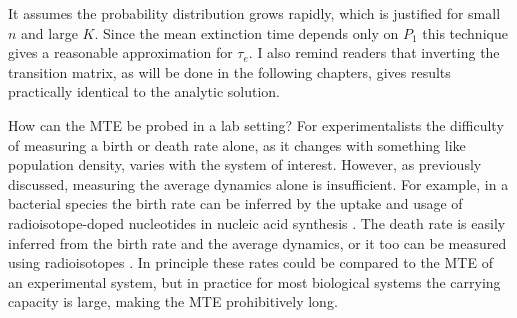 It assumes the probability distribution grows rapidly, which is justified for small $n$ and large $K$. 
Since the mean extinction time depends only on $P_1$ this technique gives a reasonable approximation for $\tau_e$. 
I also remind readers that inverting the transition matrix, as will be done in the following chapters, gives results practically identical to the analytic solution. 

How can the MTE be probed in a lab setting? 
For experimentalists the difficulty of measuring a birth or death rate alone, as it changes with something like population density, varies with the system of interest. 
However, as previously discussed, measuring the average dynamics alone is insufficient. 
For example, in a bacterial species the birth rate can be inferred by the uptake and usage of radioisotope-doped nucleotides in nucleic acid synthesis \cite{Kirchman1982}. 
The death rate is easily inferred from the birth rate and the average dynamics, or it too can be measured using radioisotopes \cite{Servais1985}. %
In principle these rates could be compared to the MTE of an experimental system, but in practice for most biological systems the carrying capacity is large, making the MTE prohibitively long. 
